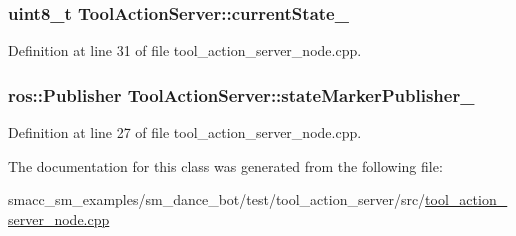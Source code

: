 \subsubsection[{\texorpdfstring{current\+State\+\_\+}{currentState_}}]{\setlength{\rightskip}{0pt plus 5cm}uint8\+\_\+t Tool\+Action\+Server\+::current\+State\+\_\+}\hypertarget{classToolActionServer_aac4862d8c313b07e8506eb0c74507fb1}{}\label{classToolActionServer_aac4862d8c313b07e8506eb0c74507fb1}


Definition at line 31 of file tool\+\_\+action\+\_\+server\+\_\+node.\+cpp.

\subsubsection[{\texorpdfstring{state\+Marker\+Publisher\+\_\+}{stateMarkerPublisher_}}]{\setlength{\rightskip}{0pt plus 5cm}ros\+::\+Publisher Tool\+Action\+Server\+::state\+Marker\+Publisher\+\_\+}\hypertarget{classToolActionServer_a1b3cb5d19e61b0207ef3f8fd99fc196d}{}\label{classToolActionServer_a1b3cb5d19e61b0207ef3f8fd99fc196d}


Definition at line 27 of file tool\+\_\+action\+\_\+server\+\_\+node.\+cpp.



The documentation for this class was generated from the following file\+:\begin{DoxyCompactItemize}
\item 
smacc\+\_\+sm\+\_\+examples/sm\+\_\+dance\+\_\+bot/test/tool\+\_\+action\+\_\+server/src/\hyperlink{sm__dance__bot_2test_2tool__action__server_2src_2tool__action__server__node_8cpp}{tool\+\_\+action\+\_\+server\+\_\+node.\+cpp}\end{DoxyCompactItemize}
